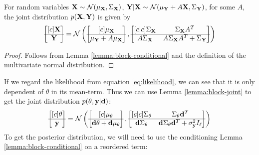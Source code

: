 \begin{lemma}
  \label{lemma:block-joint}
  For random variables $\mathbf{X} \sim \mathcal{N}(\mathbf{\mu}_{\mathbf{X}}, \Sigma_{\mathbf{X}})$, $\mathbf{Y}|\mathbf{X} \sim \mathcal{N}(\mathbf{\mu}_{\mathbf{Y}} + A\mathbf{X}, \Sigma_{\mathbf{Y}})$,
  for some $A$, the joint distribution $p(\mathbf{X}, \mathbf{Y})$ is given by
  \begin{equation}
    \begin{bmatrix}[c]
      \mathbf{X} \\
      \hline
      \mathbf{Y}
    \end{bmatrix}
    =
    \mathcal{N}\left(
      \begin{bmatrix}[c]
        \mathbf{\mu}_{\mathbf{X}} \\
        \hline
        \mathbf{\mu}_{\mathbf{Y}} + A\mathbf{\mu}_{\mathbf{X}}
      \end{bmatrix},
      \begin{bmatrix}[c | c]
        \Sigma_{\mathbf{X}} & \Sigma_{\mathbf{X}}A^T \\
        \hline
        A\Sigma_{\mathbf{X}} & A\Sigma_{\mathbf{X}}A^T + \Sigma_{\mathbf{Y}}
      \end{bmatrix}
    \right)
  \end{equation}
\end{lemma}
\begin{proof}
  Follows from Lemma \ref{lemma:block-conditional} and the definition of the multivariate normal distribution.
\end{proof}
If we regard the likelihood from equation \ref{eq:likelihood}, we can see that it is only dependent of $\theta$ in its mean-term.
Thus we can use Lemma \ref{lemma:block-joint} to get the joint distribution $p(\theta, \mathbf{y} | \mathbf{d})$:
\begin{equation}
  \begin{bmatrix}[c]
    \theta \\
    \hline
    \mathbf{y}
  \end{bmatrix}
  =
  \mathcal{N}\left(
    \begin{bmatrix}[c]
      \mu_\theta \\
      \hline
      \mathbf{d}\theta + \mathbf{d}\mu_\theta
    \end{bmatrix},
    \begin{bmatrix}[c | c]
      \Sigma_{\mathbf{\theta}} & \Sigma_{\mathbf{\theta}}\mathbf{d}^T \\
      \hline
      \mathbf{d}\Sigma_{\mathbf{\theta}} & \mathbf{d}\Sigma_{\mathbf{\theta}}\mathbf{d}^T + \sigma^2_{\mathbf{y}} I_\ell
    \end{bmatrix}
  \right)
\end{equation}
To get the posterior distribution, we will need to use the conditioning Lemma \ref{lemma:block-conditional} on a reordered term:
